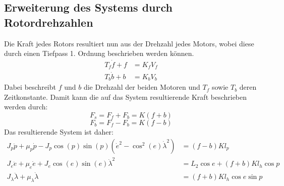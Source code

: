 \documentclass{article}
\begin{document}
	\subsection{Erweiterung des Systems durch Rotordrehzahlen}
	Die Kraft jedes Rotors resultiert nun aus der Drehzahl jedes Motors, wobei diese durch einen Tiefpass 1. Ordnung beschrieben werden können.
	\begin{align}
	T_f \dot{f} + f &= K_f V_f\\
	T_b \dot{b} + b &= K_b V_b
	\end{align}
	Dabei beschreibt $f$ und $b$ die Drehzahl der beiden Motoren und $T_f$ sowie $T_b$ deren Zeitkonstante.
	Damit kann die auf das System resultierende Kraft beschrieben werden durch:
	\begin{equation}
	F_s = F_f + F_b = K (f + b)
	\end{equation}
	\begin{equation}
	F_b = F_f - F_b = K (f - b)
	\end{equation}
	Das resultierende System ist daher:
	\begin{align}
	J_p \ddot{p} + \mu_p \dot{p} - J_p \cos (p) \sin (p) (\dot{e}^2- \cos^2 (e) \dot{\lambda}^2) &= (f - b) K l_p\\
	J_e\ddot{e} + \mu_e \dot{e} + J_e \cos (e) \sin (e) \dot{\lambda}^2 
	&= L_2 \cos e + (f + b) K l_h \cos p\\
	J_\lambda \ddot{\lambda} + \mu_\lambda \dot{\lambda} &= (f + b) K l_h \cos e \sin p
	\end{align}
	
\end{document}
